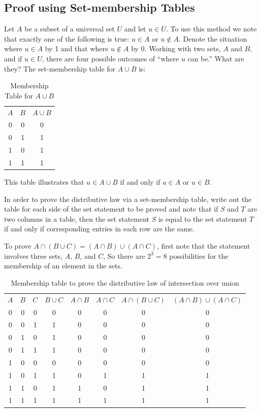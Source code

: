 \documentclass[10pt,]{book}
\theoremstyle{plain}
\theoremstyle{definition}
\theoremstyle{definition}
\theoremstyle{definition}
\begin{document}
\typeout{************************************************}
\typeout{************************************************}
\subsection[Proof using Set-membership Tables]{Proof using Set-membership Tables}\label{ss-membership-table-proof}
Let \(A\) be a subset of a universal set \(U\) and let \(u\in U\). To use this method we note that exactly one of the following is true: \(u \in  A\) or \(u\notin  A\). Denote the situation where \(u \in  A\) by 1 and that where \(u \notin  A\) by 0. Working with two sets, \(A\) and \(B\), and if \(u \in  U\), there are four possible outcomes of ``where \(u\) can be.'' What are they? The set-membership table for \(A \cup  B\) is:%
\leavevmode%
\begin{table}
\centering
\begin{tabular}{ccc}
 \(A\)  & \(B\)  &\(A \cup  B\)\tabularnewline[0pt]
 0 & 0 & 0 \tabularnewline[0pt]
 0 & 1 & 1 \tabularnewline[0pt]
 1 & 0 & 1 \tabularnewline[0pt]
 1 & 1 & 1 
\end{tabular}
\caption{Membership Table for \(A \cup  B\)\label{mt-union}}
\end{table}
\par
This table illustrates that \(u\in A \cup  B\) if and only if \(a\in A\) or \(u \in  B\).%
\par
In order to prove the distributive law via a set-membership table, write out the table for each side of the set statement to be proved and note that if \(S\) and \(T\) are two columns in a table, then the set statement \(S\) is equal to the set statement \(T\) if and only if corresponding entries in each row are the same.%
\par
To prove \(A \cap  (B \cup  C) = (A \cap  B) \cup  (A \cap  C)\), first note that the statement involves three sets, \(A\), \(B\), and \(C\), So there are \(2^3= 8\) possibilities for the membership of an element in the sets.%
\leavevmode%
\begin{table}
\centering
\begin{tabular}{cccccccc}
\(A\)&\(B\)&\(C\)&\(B \cup  C\)&\(A \cap B\)&\(A \cap C\)&\(A \cap  (B \cup  C)\)&\( (A \cap  B) \cup  (A \cap  C)\)\tabularnewline[0pt]
0&0&0&0&0&0&0&0\tabularnewline[0pt]
0&0&1&1&0&0&0&0\tabularnewline[0pt]
0&1&0&1&0&0&0&0\tabularnewline[0pt]
0&1&1&1&0&0&0&0\tabularnewline[0pt]
1&0&0&0&0&0&0&0\tabularnewline[0pt]
1&0&1&1&0&1&1&1\tabularnewline[0pt]
1&1&0&1&1&0&1&1\tabularnewline[0pt]
1&1&1&1&1&1&1&1
\end{tabular}
\caption{Membership table to prove the distributive law of intersection over union\label{tab-mt-distr}}
\end{table}
\end{document}
